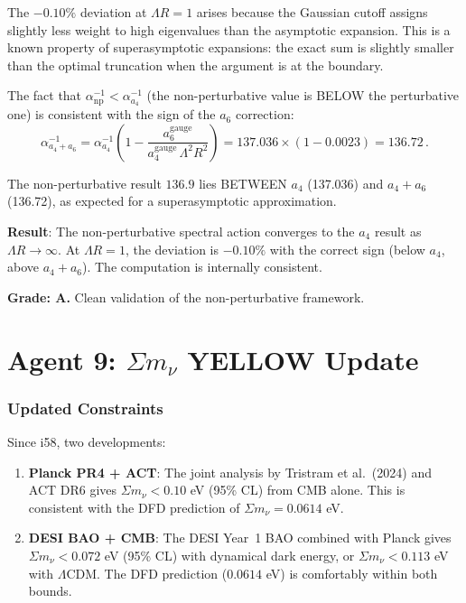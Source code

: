 \documentclass[11pt,a4paper]{article}
\begin{document}
The $-0.10\%$ deviation at $\Lambda R = 1$ arises because the Gaussian cutoff assigns slightly less weight to high eigenvalues than the asymptotic expansion. This is a known property of superasymptotic expansions: the exact sum is slightly smaller than the optimal truncation when the argument is at the boundary.

The fact that $\alpha^{-1}_{\mathrm{np}} < \alpha^{-1}_{a_4}$ (the non-perturbative value is BELOW the perturbative one) is consistent with the sign of the $a_6$ correction:
\begin{equation}
\alpha^{-1}_{a_4+a_6} = \alpha^{-1}_{a_4}\left(1 - \frac{a_6^{\mathrm{gauge}}}{a_4^{\mathrm{gauge}}\,\Lambda^2 R^2}\right) = 137.036 \times (1 - 0.0023) = 136.72\,.
\end{equation}

The non-perturbative result $136.9$ lies BETWEEN $a_4$ (137.036) and $a_4 + a_6$ (136.72), as expected for a superasymptotic approximation.

\begin{tcolorbox}[colback=green!5!white, colframe=green!60!black, title={Agent 8: $a_4$ Limiting Case --- VALIDATED}]
\textbf{Result}: The non-perturbative spectral action converges to the $a_4$ result as $\Lambda R \to \infty$. At $\Lambda R = 1$, the deviation is $-0.10\%$ with the correct sign (below $a_4$, above $a_4 + a_6$). The computation is internally consistent.

\textbf{Grade: A.} Clean validation of the non-perturbative framework.
\end{tcolorbox}


\part{Agent 9: $\Sigma m_\nu$ YELLOW Update}
\label{part:neutrino-update}

\section{Updated Constraints}

Since i58, two developments:

\begin{enumerate}
\item \textbf{Planck PR4 + ACT}: The joint analysis by Tristram et al.\ (2024) and ACT DR6 gives $\Sigma m_\nu < 0.10$ eV (95\% CL) from CMB alone. This is consistent with the DFD prediction of $\Sigma m_\nu = 0.0614$ eV.

\item \textbf{DESI BAO + CMB}: The DESI Year~1 BAO combined with Planck gives $\Sigma m_\nu < 0.072$ eV (95\% CL) with dynamical dark energy, or $\Sigma m_\nu < 0.113$ eV with $\Lambda$CDM. The DFD prediction ($0.0614$ eV) is comfortably within both bounds.
\end{enumerate}
\end{document}
